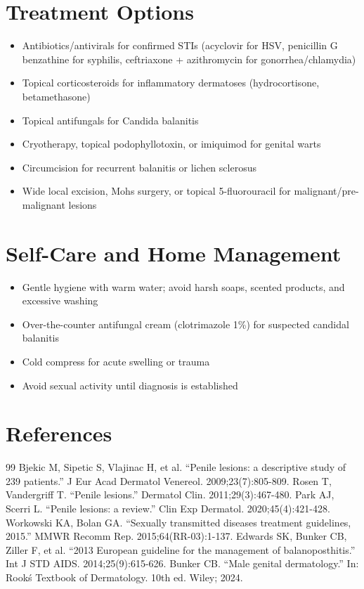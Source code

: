 \section*{Treatment Options}
\begin{itemize}
  \item Antibiotics/antivirals for confirmed STIs (acyclovir for HSV, penicillin G benzathine for syphilis, ceftriaxone + azithromycin for gonorrhea/chlamydia)
  \item Topical corticosteroids for inflammatory dermatoses (hydrocortisone, betamethasone)
  \item Topical antifungals for Candida balanitis
  \item Cryotherapy, topical podophyllotoxin, or imiquimod for genital warts
  \item Circumcision for recurrent balanitis or lichen sclerosus
  \item Wide local excision, Mohs surgery, or topical 5-fluorouracil for malignant/pre-malignant lesions
\end{itemize}

\section*{Self-Care and Home Management}
\begin{itemize}
  \item Gentle hygiene with warm water; avoid harsh soaps, scented products, and excessive washing
  \item Over-the-counter antifungal cream (clotrimazole 1\%) for suspected candidal balanitis
  \item Cold compress for acute swelling or trauma
  \item Avoid sexual activity until diagnosis is established
\end{itemize}

\section*{References}
\begin{thebibliography}{99}
 Bjekic M, Sipetic S, Vlajinac H, et al. ``Penile lesions: a descriptive study of 239 patients.'' J Eur Acad Dermatol Venereol. 2009;23(7):805-809.
 Rosen T, Vandergriff T. ``Penile lesions.'' Dermatol Clin. 2011;29(3):467-480.
 Park AJ, Scerri L. ``Penile lesions: a review.'' Clin Exp Dermatol. 2020;45(4):421-428.
 Workowski KA, Bolan GA. ``Sexually transmitted diseases treatment guidelines, 2015.'' MMWR Recomm Rep. 2015;64(RR-03):1-137.
 Edwards SK, Bunker CB, Ziller F, et al. ``2013 European guideline for the management of balanoposthitis.'' Int J STD AIDS. 2014;25(9):615-626.
 Bunker CB. ``Male genital dermatology.'' In: Rook\'s Textbook of Dermatology. 10th ed. Wiley; 2024.
\end{thebibliography}
